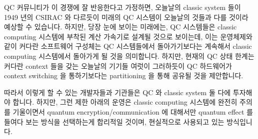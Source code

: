 QC 커뮤니티가 이 경쟁에 잘 반응한다고 가정하면, 오늘날의 classic system 들이
1949 년의 CSIRAC 와 다르듯이 미래의 QC 시스템이 오늘날의 것들과 다를 것이라
예상할 수 있습니다.
하지만, 당장 눈에 보이는 미래에는, QC 시스템들은 classic computing 시스템에
부착된 계산 가속기로 설계될 것으로 보이는데, 이는 운영체제와 같이 커다란
소프트웨어 구성체는 QC 시스템들에서 돌아가기보다는 계속해서 classic computing
시스템에서 돌아가게 될 것을 의미합니다.
하지만, 현재의 QC 상태 한계는 커다란 context 들을 갖는 오늘날의 기기들 여럿이
그러하듯이 QC 하드웨어가 context switching 을 통하기보다는 partitioning 을 통해
공유될 것을 제안합니다.

따라서 이렇게 할 수 있는 개발자들과 기관들은 QC 와 classic system 둘 다에
투자해야 합니다.
하지만, 그런 제한 아래의 운영은 classic computing 시스템에 완전히 주의를
기울이면서 quantum encryption/communication 에 대해서만 quantum effect 를
들여다 보는 방식을 선택하는게 합리적일 것이며, 현실적으로 사용되고 있는
방식입니다.

